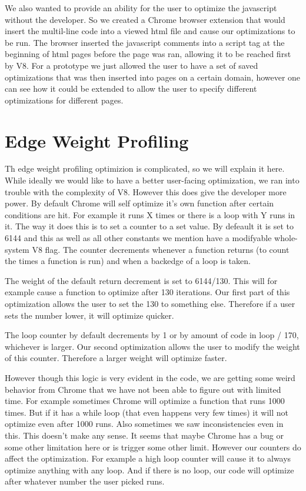 \documentclass[twocolumn,showpacs,%
  nofootinbib,aps,superscriptaddress,%
  eqsecnum,prd,notitlepage,showkeys,10pt]{revtex4-1}
\begin{document}
We also wanted to provide an ability for the user to optimize the javascript without the developer. So we created a Chrome browser extension that would insert the multil-line code into a viewed html file and cause our optimizations to be run. The browser inserted the javascript comments into a script tag at the beginning of html pages before the page was ran, allowing it to be reached first by V8. For a prototype we just allowed the user to have a set of saved optimizations that was then inserted into pages on a certain domain, however one can see how it could be extended to allow the user to specify different optimizations for different pages.

\section{Edge Weight Profiling}
Th edge weight profiling optimizion is complicated, so we will explain it here. While ideally we would like to have a better user-facing optimization, we ran into trouble with the complexity of V8. However this does give the developer more power. By default Chrome will self optimize it's own function after certain conditions are hit. For example it runs X times or there is a loop with Y runs in it. The way it does this is to set a counter to a set value. By defeault it is set to 6144 and this as well as all other constants we mention have a modifyable whole-system V8 flag. The counter decrements whenever a function returns (to count the times a function is run) and when a backedge of a loop is taken. 

The weight of the default return decrement is set to 6144/130.  This will for example cause a function to optimize after 130 iterations. Our first part of this optimization allows the user to set the 130 to something else. Therefore if a user sets the number lower, it will optimize quicker.

The loop counter by default decrements by 1 or by amount of code in loop / 170, whichever is larger. Our second optimization allows the user to modify the weight of this counter. Therefore a larger weight will optimize faster.

However though this logic is very evident in the code, we are getting some weird behavior from Chrome that we have not been able to figure out with limited time. For example sometimes Chrome will optimize a function that runs 1000 times. But if it has a while loop (that even happens very few times) it will not optimize even after 1000 runs. Also sometimes we saw inconsistencies even in this. This doesn't make any sense. It seems that maybe Chrome has a bug or some other limitation here or is trigger some other limit. However our counters do affect the optimization. For example a high loop counter will cause it to always optimize anything with any loop. And if there is no loop, our code will optimize after whatever number the user picked runs. 
\end{document}
